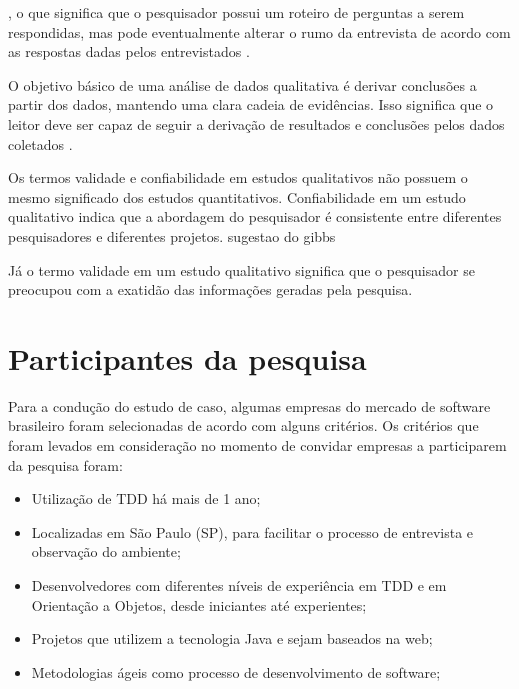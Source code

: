 , o que
significa que o pesquisador possui um roteiro de perguntas a serem respondidas, 
mas pode eventualmente alterar o rumo da entrevista de acordo com as respostas 
dadas pelos entrevistados \cite{guidelines-case-study}. 

O objetivo básico de uma análise de dados qualitativa é derivar conclusões a
partir dos dados, mantendo uma clara cadeia de evidências. Isso significa que  o
leitor deve ser capaz de seguir a derivação de resultados e conclusões pelos 
dados coletados \cite{yin}.

Os termos validade e confiabilidade em estudos qualitativos não possuem o mesmo 
significado dos estudos quantitativos. Confiabilidade em um estudo qualitativo 
indica que a abordagem do pesquisador é consistente entre diferentes
pesquisadores e diferentes projetos. 
sugestao do gibbs

Já o termo validade em um estudo qualitativo significa que o pesquisador  se
preocupou com a exatidão das informações geradas pela pesquisa. 


\section{Participantes da pesquisa}
\label{sec:planejamento-participantes}

Para a condução do estudo de caso, algumas empresas do mercado de software
brasileiro foram selecionadas de acordo com alguns critérios.
Os critérios que foram levados em consideração no momento de convidar empresas a
participarem da pesquisa foram:

\begin{itemize}
	\item Utilização de TDD há mais de 1 ano;

	\item Localizadas em São Paulo (SP), para facilitar o processo de
	entrevista e observação do ambiente;

	\item Desenvolvedores com diferentes níveis de experiência em TDD e em 
	Orientação a Objetos, desde iniciantes até experientes;

	\item Projetos que utilizem a tecnologia Java e sejam baseados na web;

	\item Metodologias ágeis como processo de desenvolvimento de
	software;
\end{itemize}

